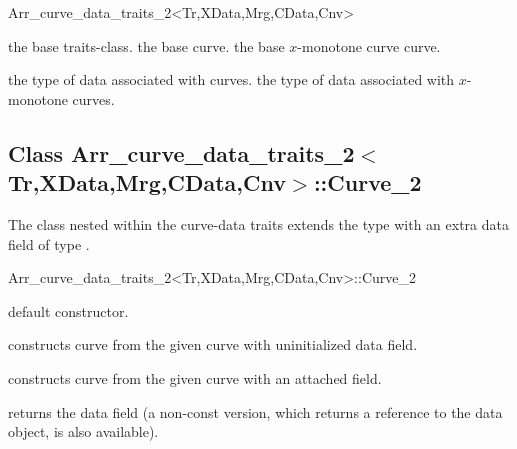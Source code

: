 \begin{ccRefClass}{Arr_curve_data_traits_2<Tr,XData,Mrg,CData,Cnv>}
 
\ccIsModel

\ccTypes

    {the base traits-class.}
\ccGlue
{}
    {the base curve.}
\ccGlue
{}
    {the base $x$-monotone curve curve.}

\ccGlue
{}

    {the type of data associated with curves.}
\ccGlue
{}
    {the type of data associated with $x$-monotone curves.}

\ccInheritsFrom

\subsection*{Class Arr\_curve\_data\_traits\_2$<$Tr,XData,Mrg,CData,Cnv$>$::Curve\_2}

The  class nested within the curve-data traits
extends the  type with an extra data field of type
.

\begin{ccClass}{Arr_curve_data_traits_2<Tr,XData,Mrg,CData,Cnv>::Curve_2}

\ccInheritsFrom

\ccCreation
{}

    {default constructor.}

    {constructs curve from the given  curve with uninitialized
     data field.}

    {constructs curve from the given  curve with an attached
      field.}

\ccAccessFunctions

  {returns the data field (a non-const version, which returns a reference
   to the data object, is also available).}


\end{ccClass}
\end{ccRefClass}
